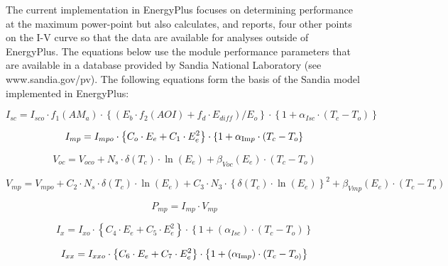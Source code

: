 The current implementation in EnergyPlus focuses on determining performance at the maximum power-point but also calculates, and reports, four other points on the I-V curve so that the data are available for analyses outside of EnergyPlus. The equations below use the module performance parameters that are available in a database provided by Sandia National Laboratory (see www.sandia.gov/pv). The following equations form the basis of the Sandia model implemented in EnergyPlus:

\begin{equation}
{I_{sc}} = {I_{sco}} \cdot {f_1}\left( {A{M_a}} \right) \cdot \left\{ {\left( {{E_b} \cdot {f_2}\left( {AOI} \right) + {f_d} \cdot {E_{diff}}} \right)/{E_o}} \right\} \cdot \left\{ {1 + {\alpha_{Isc}} \cdot \left( {{T_c} - {T_o}} \right)} \right\}
\end{equation}

\begin{equation}
{I_{mp}} = {I_{mpo}} \cdot \left\{ {{C_o} \cdot {E_e} + {C_1} \cdot E_e^2} \right\} \cdot \left\{ {1 + {\alpha_{{\mathop{\rm Im}\nolimits} p}} \cdot ({T_c} - {T_o}} \right\}
\end{equation}

\begin{equation}
{V_{oc}} = {V_{oco}} + {N_s} \cdot \delta ({T_c}) \cdot \ln ({E_e}) + {\beta_{Voc}}({E_e}) \cdot \left( {{T_c} - {T_o}} \right)
\end{equation}

\begin{equation}
{V_{mp}} = {V_{mpo}} + {C_2} \cdot {N_s} \cdot \delta \left( {T_c^{}} \right) \cdot \ln \left( {{E_e}} \right) + {C_3} \cdot {N_3} \cdot {\left\{ {\delta \left( {T_c^{}} \right) \cdot \ln \left( {{E_e}} \right)} \right\}^2} + {\beta_{Vmp}}({E_e}) \cdot ({T_c} - {T_o})
\end{equation}

\begin{equation}
{P_{mp}} = {I_{mp}} \cdot {V_{mp}}
\end{equation}

\begin{equation}
{I_x} = {I_{xo}} \cdot \left\{ {{C_4} \cdot {E_e} + {C_5} \cdot E_e^2} \right\} \cdot \left\{ {1 + ({\alpha_{Isc}}) \cdot ({T_c} - {T_o})} \right\}
\end{equation}

\begin{equation}
{I_{xx}} = {I_{xxo}} \cdot \left\{ {{C_6} \cdot {E_e} + {C_7} \cdot E_e^2} \right\} \cdot \left\{ {1 + ({\alpha_{{\mathop{\rm Im}\nolimits} p}}) \cdot ({T_c} - {T_{o)}}} \right\}
\end{equation}

